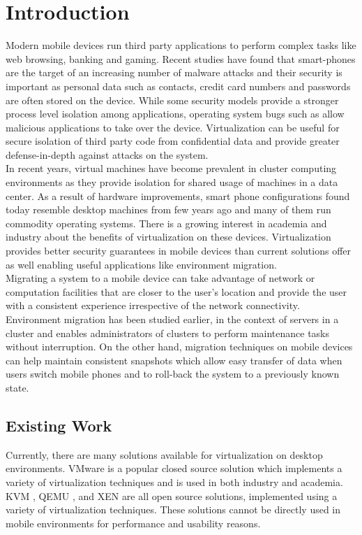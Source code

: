 \section{Introduction}
Modern mobile devices run third party applications to perform complex tasks like web browsing, banking and gaming. Recent studies have found that smart-phones are the target of an increasing number of malware attacks \cite{bose2006mobile, cybercriminals2007banks, iphone2010seriot} and their security is important as personal data such as contacts, credit card numbers and passwords are often stored on the device. While some security models \cite{androidsecurity} provide a stronger process level isolation among applications, operating system bugs such as \cite{sms2009iphone,opencore2009android,kernel2009vulnerability} allow malicious applications to take over the device. Virtualization can be useful for secure isolation of third party code from confidential data and provide greater defense-in-depth against attacks on the system.\\

In recent years, virtual machines have become prevalent in cluster computing environments \cite{gartner2009virtual} as they provide isolation for shared usage of machines in a data center. As a result of hardware improvements, smart phone configurations found today resemble desktop machines from few years ago and many of them run commodity operating systems. There is a growing interest in academia \cite{cox2007pocket} and industry \cite{vmware2009nextfrontier} about the benefits of virtualization on these devices. Virtualization provides better security guarantees in mobile devices than current solutions offer as well enabling useful applications like environment migration. \\

Migrating a system to a mobile device can take advantage of network or computation facilities that are closer to the user's location and provide the user with a consistent experience irrespective of the network connectivity. Environment migration has been studied earlier, in the context of servers in a cluster \cite{clark2005live} and enables administrators of clusters to perform maintenance tasks without interruption. On the other hand, migration techniques on mobile devices can help maintain consistent snapshots which allow easy transfer of data when users switch mobile phones and to roll-back the system to a previously known state.

\subsection{Existing Work}
Currently, there are many solutions available for virtualization on desktop environments.  VMware is a popular closed source solution which implements a variety of virtualization techniques and is used in both industry and academia.  KVM \cite{kvm}, QEMU \cite{qemu}, and XEN \cite{xen} are all open source solutions, implemented using a variety of virtualization techniques.  These solutions cannot be directly used in mobile environments for performance and usability reasons. \\

